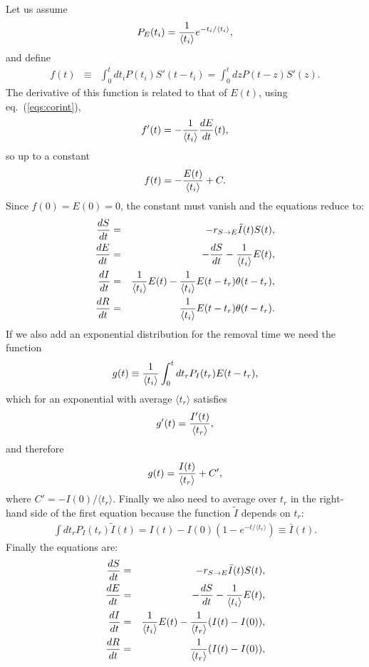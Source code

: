 \documentclass[a4paper,oneside,11pt]{article}
\begin{document}
 Let us assume
\begin{eqnarray}
P_E(t_i) = {1\over \langle t_i\rangle} e^{-t_i/\langle t_i\rangle},
\end{eqnarray}
and define
\begin{eqnarray}
f(t) &\equiv& \int_0^t dt_i P(t_i)  S'(t-t_i) = \int_0^t dz P(t-z) S'(z).
\end{eqnarray}
The derivative of this function is related to that of $E(t)$, using eq.~(\ref{eqs:corint}),
\begin{eqnarray}
f'(t)  = - {1\over \langle t_i\rangle} {dE\over d t}(t),
\end{eqnarray}
so up to a constant
\begin{eqnarray}
f(t) = -{E(t)\over \langle t_i\rangle} +C.
\end{eqnarray}
Since $f(0) = E(0) =0$, the constant must vanish and the equations reduce to:
\begin{eqnarray}
{d S\over dt} &=& - r_{S\rightarrow E} \tilde{I}(t) S(t),\nonumber\\
{d E\over dt} &=& -{d S\over d t} - {1 \over \langle t_i\rangle} E(t) ,\nonumber\\
{d I\over dt} &=& {1 \over \langle t_i\rangle} E(t) -{1\over \langle t_i\rangle} E(t-t_r) \theta(t-t_r),\nonumber\\
{d R\over d t} &=&  {1\over  \langle t_i\rangle} E(t-t_r) \theta(t-t_r).
\end{eqnarray}
If we also add an exponential distribution for the removal time we need the function
\begin{eqnarray}
g(t) \equiv {1\over \langle t_i\rangle } \int_0^t dt_r P_I(t_r) E(t-t_r),
\end{eqnarray}
which for an exponential with average $\langle t_r\rangle$ satisfies
\begin{eqnarray}
g'(t) =  {I'(t)\over \langle t_r \rangle},
\end{eqnarray}
and therefore
\begin{eqnarray}
g(t) = {I(t)\over \langle t_r \rangle} + C',
\end{eqnarray}
where $C'= -I(0)/\langle t_r \rangle$.
Finally we also need to average over $t_r$ in the right-hand side of the first equation because the function $\tilde{I}$ depends on $t_r$:
\begin{eqnarray}
\int d t_r P_I(t_r) \tilde{I}(t) = I(t) - I(0) \left(1- e^{-t/\langle t_r\rangle}  \right) \equiv \bar{I}(t).
\end{eqnarray}
Finally the equations are:
\begin{eqnarray}
{d S\over dt} &=& - r_{S\rightarrow E} \bar{I}(t) S(t),\nonumber\\
{d E\over dt} &=& -{d S\over d t} -{1 \over \langle t_i\rangle} E(t) ,\nonumber\\
{d I\over dt} &=& {1 \over \langle t_i\rangle} E(t) - {1\over  \langle t_r \rangle} (I(t) -I(0)),\nonumber\\
{d R\over d t} &=&  {1\over  \langle t_r\rangle} (I(t)-I(0)),\nonumber\\
\label{eqs:seirexp}
\end{eqnarray}
\end{document}
